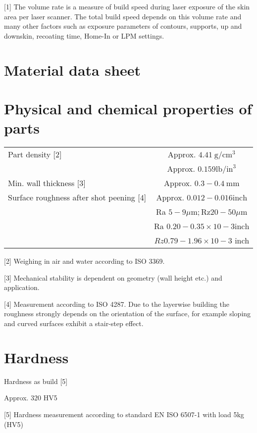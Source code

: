 \documentclass[10pt]{article}
\begin{document}
[1] The volume rate is a measure of build speed during laser exposure of the skin area per laser scanner. The total build speed depends on this volume rate and many other factors such as exposure parameters of contours, supports, up and downskin, recoating time, Home-In or LPM settings.

\section*{Material data sheet}
\section*{Physical and chemical properties of parts}
\begin{center}
\begin{tabular}{lc}
\hline
Part density [2] & Approx. $4.41 \mathrm{~g} / \mathrm{cm}^{3}$ \\
 & Approx. $0.159 \mathrm{lb} / \mathrm{in}^{3}$ \\
\hline
Min. wall thickness [3] & Approx. $0.3-0.4 \mathrm{~mm}$ \\
\hline
Surface roughness after shot peening [4] & Approx. $0.012-0.016 \mathrm{inch}$ \\
 & Ra $5-9 \mu \mathrm{m} ; \mathrm{Rz} 20-50 \mu \mathrm{m}$ \\
 & Ra $0.20-0.35 \times 10-3 \mathrm{inch}$ \\
 & $R z 0.79-1.96 \times 10-3$ inch \\
\hline
\end{tabular}
\end{center}

[2] Weighing in air and water according to ISO 3369.

[3] Mechanical stability is dependent on geometry (wall height etc.) and application.

[4] Measurement according to ISO 4287. Due to the layerwise building the roughness strongly depends on the orientation of the surface, for example sloping and curved surfaces exhibit a stair-step effect.

\section*{Hardness}
Hardness as build [5]

Approx. 320 HV5

[5] Hardness measurement according to standard EN ISO 6507-1 with load 5kg (HV5)
\end{document}
